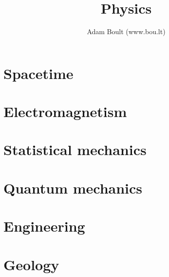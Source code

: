 \documentclass[oneside]{book}
\begin{document}
\author{Adam Boult (www.bou.lt)}
\title{Physics}
\maketitle

\setcounter{tocdepth}{1}
\tableofcontents



\part{Spacetime}







\part{Electromagnetism}


\part{Statistical mechanics}


\part{Quantum mechanics}




\part{Engineering}


\part{Geology}

\end{document}
